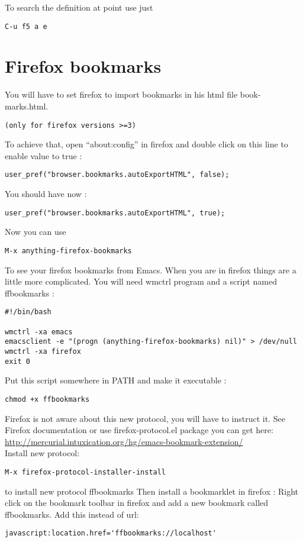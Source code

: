 \documentclass[a4paper,11pt]{article}
\begin{document}
To search the definition at point use just
\begin{verbatim}
C-u f5 a e
\end{verbatim}

\section{Firefox bookmarks}
\label{sec:firefox-bookmarks}

You will have to set firefox to import bookmarks in his html file book-marks.html. 
\begin{verbatim}
(only for firefox versions >=3)
\end{verbatim}
To achieve that, open ``about:config'' in firefox and double click on this line to enable value to true :
\begin{verbatim}
user_pref("browser.bookmarks.autoExportHTML", false);
\end{verbatim}
You should have now :
\begin{verbatim}
user_pref("browser.bookmarks.autoExportHTML", true);
\end{verbatim}
Now you can use
\begin{verbatim}
M-x anything-firefox-bookmarks
\end{verbatim}
To see your firefox bookmarks from Emacs.
When you are in firefox things are a little more complicated. You will
need wmctrl program and a script named ffbookmarks :
\begin{verbatim}
#!/bin/bash

wmctrl -xa emacs
emacsclient -e "(progn (anything-firefox-bookmarks) nil)" > /dev/null
wmctrl -xa firefox
exit 0
\end{verbatim}
Put this script somewhere in PATH and make it executable :
\begin{verbatim}
chmod +x ffbookmarks
\end{verbatim}

Firefox is not aware about this new protocol, you will have to instruct
it. See Firefox documentation or use firefox-protocol.el package you can get
here: \\
\url{http://mercurial.intuxication.org/hg/emacs-bookmark-extension/} \\
Install new protocol: \\
\begin{verbatim}
M-x firefox-protocol-installer-install
\end{verbatim}
to install new protocol ffbookmarks
Then install a bookmarklet in firefox : Right click on the bookmark
toolbar in firefox and add a new bookmark called ffbookmarks. Add this
instead of url: \\
\begin{verbatim}
javascript:location.href='ffbookmarks://localhost'
\end{verbatim}
\end{document}
